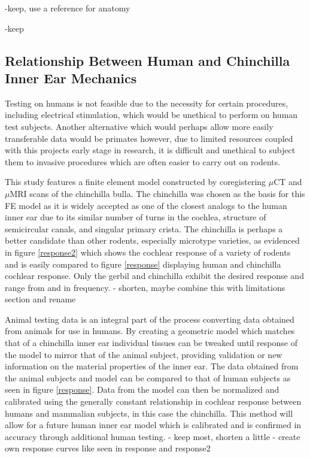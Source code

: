 \documentclass[12pt]{article}
\begin{document}
-keep, use a reference for anatomy


-keep

\subsection{Relationship Between Human and Chinchilla Inner Ear Mechanics}
Testing on humans is not feasible due to the necessity for certain procedures, including electrical stimulation, which would be unethical to perform on human test subjects. Another alternative which would perhaps allow more easily transferable data would be primates however, due to limited resources coupled with this projects early stage in research, it is difficult and unethical to subject them to invasive procedures which are often easier to carry out on rodents.

This study features a finite element model constructed by coregistering $\mu$CT and $\mu$MRI scans of the chinchilla bulla. The chinchilla was chosen as the basis for this FE model as it is widely accepted as one of the closest analogs to the human inner ear due to its similar number of turns in the cochlea, structure of semicircular canals, and singular primary crista. \cite{trevino:chinchmodel} The chinchilla is perhaps a better candidate than other rodents, especially microtype varieties, as evidenced in figure \ref{response2} which shows the cochlear response of a variety of rodents and is easily compared to figure \ref{response} displaying human and chinchilla cochlear response. Only the gerbil and chinchilla exhibit the desired response and range from and in frequency. \cite{mason}
- shorten, maybe combine this with limitations section and rename

Animal testing data is an integral part of the process converting data obtained from animals for use in humans. By creating a geometric model which matches that of a chinchilla inner ear individual tissues can be tweaked until response of the model to mirror that of the animal subject, providing validation or new information on the material properties of the inner ear. The data obtained from the animal subjects and model can be compared to that of human subjects as seen in figure \ref{response}. Data from the model can then be normalized and calibrated using the generally constant relationship in cochlear response between humans and mammalian subjects, in this case the chinchilla. This method will allow for a future human inner ear model which is calibrated and is confirmed in accuracy through additional human testing.
- keep most, shorten a little
- create own response curves like seen in response and response2
\end{document}
